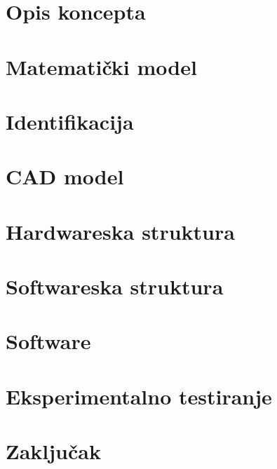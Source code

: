 \documentclass[11pt,a4paper]{article}
\begin{document}
\setcounter{page}{1}

\newpage
\section{Opis koncepta} 


\newpage
\section{Matematički model}


\newpage
\section{Identifikacija}


\newpage
\section{CAD model}


\newpage
\section{Hardwareska struktura}


\newpage
\section{Softwareska struktura}
\section{Software}

\newpage
\section{Eksperimentalno testiranje}



\newpage
\section{Zaključak} 



\end{document}
